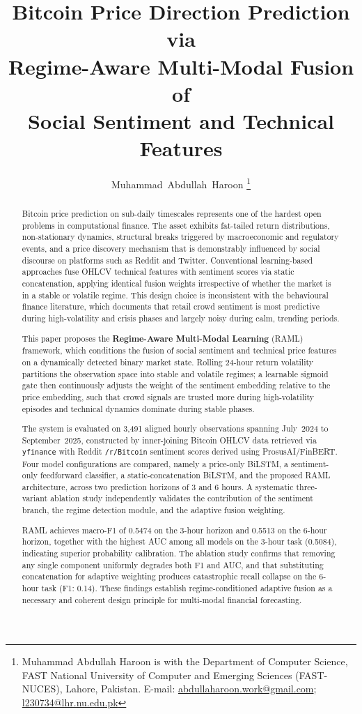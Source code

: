 \documentclass[journal]{IEEEtran}
\title{Bitcoin Price Direction Prediction via\\
Regime-Aware Multi-Modal Fusion of\\
Social Sentiment and Technical Features}
\author{Muhammad~Abdullah~Haroon%
  \thanks{Muhammad Abdullah Haroon is with the Department of Computer Science,
    FAST National University of Computer and Emerging Sciences (FAST-NUCES),
    Lahore, Pakistan.
    E-mail: \href{mailto:abdullaharoon.work@gmail.com}{abdullaharoon.work@gmail.com};
    \href{mailto:l230734@lhr.nu.edu.pk}{l230734@lhr.nu.edu.pk}}%
}
\newcommand{\raml}{\textsc{RAML}}
\newcommand{\bilstm}{BiLSTM}
\begin{document}
\maketitle

\begin{abstract}
Bitcoin price prediction on sub-daily timescales represents one of the hardest
open problems in computational finance. The asset exhibits fat-tailed return
distributions, non-stationary dynamics, structural breaks triggered by
macroeconomic and regulatory events, and a price discovery mechanism that is
demonstrably influenced by social discourse on platforms such as Reddit and
Twitter. Conventional learning-based approaches fuse OHLCV technical features
with sentiment scores via static concatenation, applying identical fusion weights
irrespective of whether the market is in a stable or volatile regime. This design
choice is inconsistent with the behavioural finance literature, which documents
that retail crowd sentiment is most predictive during high-volatility and crisis
phases and largely noisy during calm, trending periods.

This paper proposes the \textbf{Regime-Aware Multi-Modal Learning} (\raml{})
framework, which conditions the fusion of social sentiment and technical price
features on a dynamically detected binary market state. Rolling 24-hour return
volatility partitions the observation space into stable and volatile regimes; a
learnable sigmoid gate then continuously adjusts the weight of the sentiment
embedding relative to the price embedding, such that crowd signals are trusted
more during high-volatility episodes and technical dynamics dominate during stable
phases.

The system is evaluated on 3,491 aligned hourly observations spanning July~2024
to September~2025, constructed by inner-joining Bitcoin OHLCV data retrieved via
\texttt{yfinance} with Reddit \texttt{/r/Bitcoin} sentiment scores derived using
ProsusAI/FinBERT. Four model configurations are compared, namely a price-only
\bilstm{}, a sentiment-only feedforward classifier, a static-concatenation
\bilstm{}, and the proposed \raml{} architecture, across two prediction horizons
of 3 and 6 hours. A systematic three-variant ablation study independently
validates the contribution of the sentiment branch, the regime detection module,
and the adaptive fusion weighting.

\raml{} achieves macro-F1 of 0.5474 on the 3-hour horizon and 0.5513 on the
6-hour horizon, together with the highest AUC among all models on the 3-hour task
(0.5084), indicating superior probability calibration. The ablation study
confirms that removing any single component uniformly degrades both F1 and AUC,
and that substituting concatenation for adaptive weighting produces catastrophic
recall collapse on the 6-hour task (F1: 0.14). These findings establish
regime-conditioned adaptive fusion as a necessary and coherent design principle
for multi-modal financial forecasting.
\end{abstract}
\end{document}
